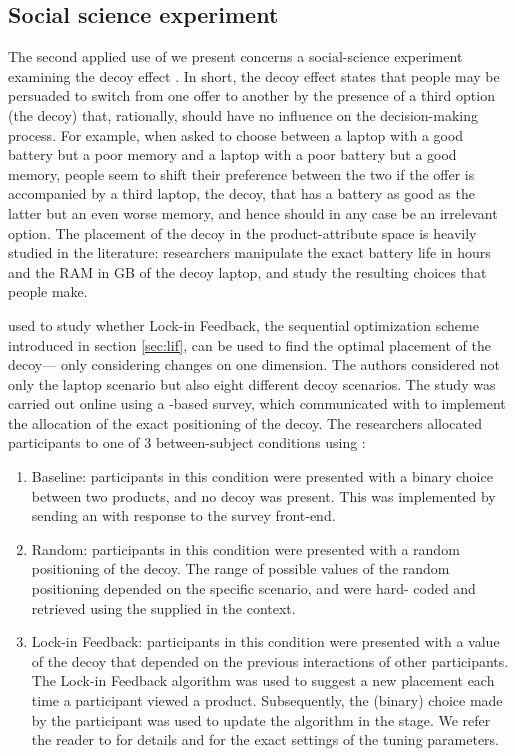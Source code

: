 \documentclass[nojss]{jss}
\begin{document}
\subsection{Social science experiment}

The second applied use of  we present concerns a social-science experiment examining the decoy effect \citep[see][for a full description of the experiment]{kaptein2016tracking}. In short, the decoy effect states that people may be persuaded to switch from one offer to another by the presence of a third option (the decoy) that, rationally, should have no influence on the decision-making process. For example, when asked to choose between a laptop with a good battery but a poor memory and a laptop with a poor battery but a good memory, people seem to shift their preference between the two if the offer is accompanied by a third laptop, the decoy, that has a battery as good as the latter but an even worse memory, and hence should in any case be an irrelevant option. The placement of the decoy in the product-attribute space is heavily studied in the literature: researchers manipulate the exact battery life in hours and the RAM in GB of the decoy laptop, and study the resulting choices that people make.

\citet{kaptein2016tracking} used  to study whether Lock-in Feedback, the sequential optimization scheme introduced in section \ref{sec:lif}, can be used to find the optimal placement of the decoy--- only considering changes on one dimension. The authors considered not only the laptop scenario but also eight different decoy scenarios. The study was carried out online using a -based survey, which communicated with  to implement the allocation of the exact positioning of the decoy. The researchers allocated participants to one of $3$ between-subject conditions using :
\begin{enumerate}
\item Baseline: participants in this condition were presented with a binary choice between two products, and no decoy was present. This was implemented by sending an  with	 response to the survey front-end.
\item Random: participants in this condition were presented with a random positioning of the decoy. The range of possible values of the random positioning depended on the specific scenario, and were hard- coded and retrieved using the  supplied in the context.
\item Lock-in Feedback: participants in this condition were presented with a value of the decoy that depended on the previous interactions of other participants. The Lock-in Feedback algorithm was used to suggest a new placement each time a participant viewed a product. Subsequently, the (binary) choice made by the participant was used to update the algorithm in the  stage. We refer the reader to \citep{kaptein2016tracking} for details and for the exact settings of the tuning parameters.
\end{enumerate}
\end{document}
